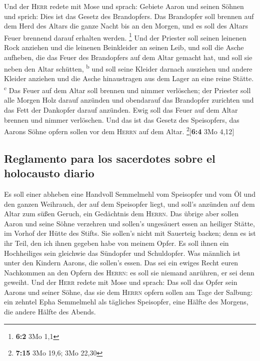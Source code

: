  Und der \textsc{Herr} redete mit Mose und sprach:
 Gebiete Aaron und seinen Söhnen und sprich: Dies ist das
Gesetz des Brandopfers. Das Brandopfer soll brennen auf dem Herd des
Altars die ganze Nacht bis an den Morgen, und es soll des Altars Feuer
brennend darauf erhalten werden. \footnote{\textbf{6:2} 3Mo 1,1}
 Und der Priester soll seinen leinenen Rock anziehen und
die leinenen Beinkleider an seinen Leib, und soll die Asche aufheben,
die das Feuer des Brandopfers auf dem Altar gemacht hat, und soll sie
neben den Altar schütten, \textsuperscript{b}  und soll
seine Kleider darnach ausziehen und andere Kleider anziehen und die
Asche hinaustragen aus dem Lager an eine reine Stätte.
\textsuperscript{c}  Das Feuer auf dem Altar soll brennen
und nimmer verlöschen; der Priester soll alle Morgen Holz darauf
anzünden und obendarauf das Brandopfer zurichten und das Fett der
Dankopfer darauf anzünden.  Ewig soll das Feuer auf dem
Altar brennen und nimmer verlöschen.  Und das ist das
Gesetz des Speisopfers, das Aarons Söhne opfern sollen vor dem
\textsc{Herrn} auf dem Altar. \footnote{\textbf{7:15} 3Mo 19,6; 3Mo
  22,30}{[}\textbf{6:4} 3Mo 4,12{]}

\hypertarget{reglamento-para-los-sacerdotes-sobre-el-holocausto-diario}{%
\subsection{Reglamento para los sacerdotes sobre el holocausto
diario}\label{reglamento-para-los-sacerdotes-sobre-el-holocausto-diario}}

 Es soll einer abheben eine Handvoll Semmelmehl vom
Speisopfer und vom Öl und den ganzen Weihrauch, der auf dem Speisopfer
liegt, und soll's anzünden auf dem Altar zum süßen Geruch, ein
Gedächtnis dem \textsc{Herrn}.  Das übrige aber sollen
Aaron und seine Söhne verzehren und sollen's ungesäuert essen an
heiliger Stätte, im Vorhof der Hütte des Stifts.  Sie
sollen's nicht mit Sauerteig backen; denn es ist ihr Teil, den ich ihnen
gegeben habe von meinem Opfer. Es soll ihnen ein Hochheiliges sein
gleichwie das Sündopfer und Schuldopfer.  Was männlich
ist unter den Kindern Aarons, die sollen's essen. Das sei ein ewiges
Recht euren Nachkommen an den Opfern des \textsc{Herrn}: es soll sie
niemand anrühren, er sei denn geweiht.  Und der
\textsc{Herr} redete mit Mose und sprach:  Das soll das
Opfer sein Aarons und seiner Söhne, das sie dem \textsc{Herrn} opfern
sollen am Tage der Salbung: ein zehntel Epha Semmelmehl als tägliches
Speisopfer, eine Hälfte des Morgens, die andere Hälfte des Abends.

